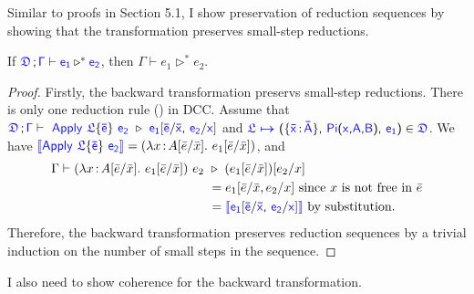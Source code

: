 Similar to proofs in Section 5.1, I show preservation of reduction sequences by showing that the transformation preserves small-step reductions.
\begin{lemma} If $\targetcon \vdash \target{e_1} \triangleright^* \target{e_2}$, then $\Gamma \vdash e_1 \triangleright^* e_2$.
\label{lem:back prev sequence}
\begin{proof}
Firstly, the backward transformation preservs small-step reductions. There is only one reduction rule () in DCC.
Assume that 
$\targetcon \vdash \ \target{Apply\ } \target{\flabel}\{\target{\bar{e}}\}\ \target{e_2}\ \triangleright\  \target{e_1}[\target{\bar{e}} \slash \target{\bar{x}} \sfcomma \target{e_2} \slash \target{x}]$ and 
$\itemdef{\target{\flabel}}{\itemtype{\bar{x}}{\bar{A}}}{\targetpi{x}{A}{B}}{\target{e_1}} \in \target{\fdef}$.
We have $\bluebr{\target{Apply\ } \target{\flabel}\{\target{\bar{e}}\}\ \target{e_2}} = (\lam{x}{A\sub{\bar{e}}{\bar{x}}}{e_1\sub{\bar{e}}{\bar{x}}})$, and
\begin{align*}
\Gamma \vdash (\lam{x}{A\sub{\bar{e}}{\bar{x}}}{e_1\sub{\bar{e}}{\bar{x}}})\ e_2\ &\triangleright\
(e_1\sub{\bar{e}}{\bar{x}})\sub{e_2}{x}\\
&= e_1[\bar{e} \slash \bar{x}, e_2 \slash x] \text{ since $x$ is not free in $\bar{e}$}\\
&= \bluebr{\target{e_1}[\target{\bar{e}} \slash \target{\bar{x}} \sfcomma \target{e_2} \slash \target{x}]} \text{ by substitution.} 
\end{align*}
Therefore, the backward transformation preserves reduction sequences by a trivial induction on the number of small steps in the sequence.
\end{proof}
\end{lemma}
I also need to show coherence for the backward transformation.

